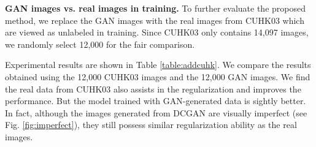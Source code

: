 \documentclass[10pt,twocolumn,letterpaper]{article}
\begin{document}


\textbf{GAN images vs. real images in training.} To further evaluate the proposed method, we replace the GAN images with the real images from CUHK03 which are viewed as unlabeled in training. Since CUHK03 only contains 14,097 images, we randomly select 12,000 for the fair comparison. 

Experimental results are shown in Table \ref{table:addcuhk}. We compare the results obtained using the 12,000 CUHK03 images and the 12,000 GAN images. We find the real data from CUHK03 also assists in the regularization and improves the performance. But the model trained with GAN-generated data is sightly better. In fact, although the images generated from DCGAN are visually imperfect (see Fig. \ref{fig:imperfect}), they still possess similar regularization ability as the real images.
\end{document}
